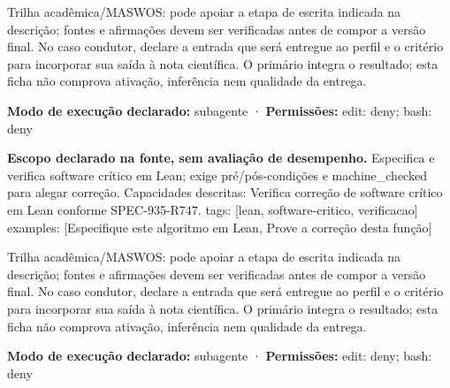 \begin{funcao}
Trilha acadêmica/MASWOS: pode apoiar a etapa de escrita indicada na descrição; fontes e afirmações devem ser verificadas antes de compor a versão final. No caso condutor, declare a entrada que será entregue ao perfil e o critério para incorporar sua saída à nota científica. O primário integra o resultado; esta ficha não comprova ativação, inferência nem qualidade da entrega.
\end{funcao}

\begin{arquitetura}
\textbf{Modo de execução declarado:} subagente · \textbf{Permissões:} edit: deny; bash: deny
\end{arquitetura}


\begin{descricao}
\textbf{Escopo declarado na fonte, sem avaliação de desempenho.}
Especifica e verifica software crítico em Lean; exige pré/pós-condições e machine\_checked para alegar correção. Capacidades descritas: Verifica correção de software crítico em Lean conforme SPEC-935-R747. tags: [lean, software-critico, verificacao] examples: [Especifique este algoritmo em Lean, Prove a correção desta função]
\end{descricao}

\begin{funcao}
Trilha acadêmica/MASWOS: pode apoiar a etapa de escrita indicada na descrição; fontes e afirmações devem ser verificadas antes de compor a versão final. No caso condutor, declare a entrada que será entregue ao perfil e o critério para incorporar sua saída à nota científica. O primário integra o resultado; esta ficha não comprova ativação, inferência nem qualidade da entrega.
\end{funcao}

\begin{arquitetura}
\textbf{Modo de execução declarado:} subagente · \textbf{Permissões:} edit: deny; bash: deny
\end{arquitetura}



